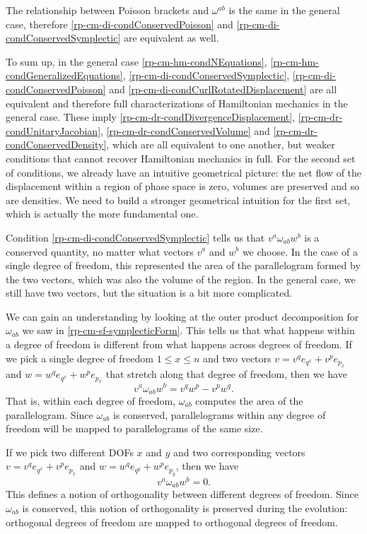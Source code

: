 The relationship between Poisson brackets and $\omega^{ab}$ is the same in the general case, therefore \ref{rp-cm-di-condConservedPoisson} and \ref{rp-cm-di-condConservedSymplectic} are equivalent as well.

To sum up, in the general case \ref{rp-cm-hm-condNEquations}, \ref{rp-cm-hm-condGeneralizedEquations}, \ref{rp-cm-di-condConservedSymplectic}, \ref{rp-cm-di-condConservedPoisson} and \ref{rp-cm-di-condCurlRotatedDisplacement} are all equivalent and therefore full characterizations of Hamiltonian mechanics in the general case. These imply \ref{rp-cm-dr-condDivergenceDisplacement}, \ref{rp-cm-dr-condUnitaryJacobian}, \ref{rp-cm-dr-condConservedVolume} and \ref{rp-cm-dr-condConservedDensity}, which are all equivalent to one another, but weaker conditions that cannot recover Hamiltonian mechanics in full. For the second set of conditions, we already have an intuitive geometrical picture: the net flow of the displacement within a region of phase space is zero, volumes are preserved and so are densities. We need to build a stronger geometrical intuition for the first set, which is actually the more fundamental one.

Condition \ref{rp-cm-di-condConservedSymplectic} tells us that $v^a \omega_{ab} w^b$ is a conserved quantity, no matter what vectors $v^a$ and $w^b$ we choose. In the case of a single degree of freedom, this represented the area of the parallelogram formed by the two vectors, which was also the volume of the region. In the general case, we still have two vectors, but the situation is a bit more complicated.

We can gain an understanding by looking at the outer product decomposition for $\omega_{ab}$ we saw in \ref{rp-cm-sf-symplecticForm}. This tells us that what happens within a degree of freedom is different from what happens across degrees of freedom. If we pick a single degree of freedom $1 \leq x \leq n$ and two vectors $v = v^q e_{q^x} + v^p e_{p_x}$ and $w = w^q e_{q^x} + w^p e_{p_x}$ that stretch along that degree of freedom, then we have
\begin{equation}
	v^a \omega_{ab} w^b =  v^q w^p - v^p w^q.
\end{equation}
That is, within each degree of freedom, $\omega_{ab}$ computes the area of the parallelogram. Since $\omega_{ab}$ is conserved, parallelograms within any degree of freedom will be mapped to parallelograms of the same size.

If we pick two different DOFs $x$ and $y$ and two corresponding vectors $v = v^q e_{q^x} + v^p e_{p_x}$ and $w = w^q e_{q^y} + w^p e_{p_y}$, then we have
\begin{equation}
	v^a \omega_{ab} w^b =  0.
\end{equation}
This defines a notion of orthogonality between different degrees of freedom. Since $\omega_{ab}$ is conserved, this notion of orthogonality is preserved during the evolution: orthogonal degrees of freedom are mapped to orthogonal degrees of freedom.

